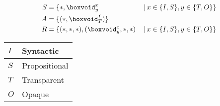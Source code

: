 \documentclass[preview]{standalone}
\begin{document}
\begin{align*}
S &= \{*, \boxvoid^x_y \, & | \, x \in \{I, S\}, y \in \{T, O\} \} \\
A &= \{(*, \boxvoid^I_T)\} \\
R &= \{(*,*,*), (\boxvoid^x_y,*,*) \, & | \, x \in \{I, S\}, y \in \{T, O\} \} \\
\end{align*}
\begin{center}
\begin{tabular}{ | l | l | }
\hline
$ I $ & Syntactic \\
\hline
$ S $ & Propositional \\
\hline
$ T $ & Transparent \\
\hline
$ O $ & Opaque \\
\hline
\end{tabular}
\end{center}
\end{document}
